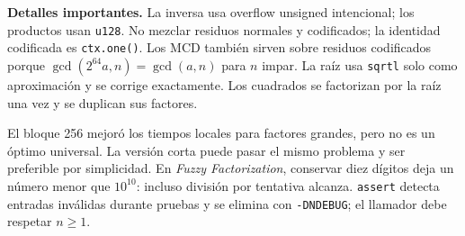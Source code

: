 \textbf{Detalles importantes.} La inversa usa overflow unsigned intencional;
los productos usan \texttt{u128}. No mezclar residuos normales y codificados;
la identidad codificada es \texttt{ctx.one()}. Los MCD tambi\'en sirven sobre
residuos codificados porque $\gcd(2^{64}a,n)=\gcd(a,n)$ para $n$ impar.
La ra\'iz usa \texttt{sqrtl} solo como aproximaci\'on y se corrige exactamente.
Los cuadrados se factorizan por la ra\'iz una vez y se duplican sus factores.

El bloque 256 mejor\'o los tiempos locales para factores grandes, pero no es
un \'optimo universal. La versi\'on corta puede pasar el mismo problema y ser
preferible por simplicidad. En \textit{Fuzzy Factorization}, conservar diez
d\'igitos deja un n\'umero menor que $10^{10}$: incluso divisi\'on por tentativa
alcanza. \texttt{assert} detecta entradas inv\'alidas durante pruebas y se
elimina con \texttt{-DNDEBUG}; el llamador debe respetar $n\ge1$.

